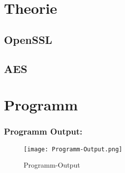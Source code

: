 \newpage

\section{Theorie}
\subsection{OpenSSL}

\subsection{AES}

\section{Programm}





\subsubsection{Programm Output:}
\begin{figure}[!htb]
    \centering
    \texttt{[image: Programm-Output.png]}
    \caption{Programm-Output}
    \label{caption:Programm-Output}
\end{figure}
